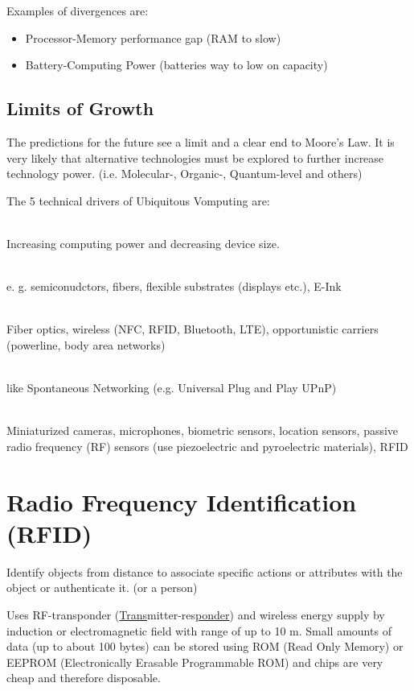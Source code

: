 \documentclass{article}
\newlength{\wideitemsep}
\let\olditem\item
\renewcommand{\item}{\setlength{\itemsep}{\wideitemsep}\olditem}
\begin{document}
\begin{multicols}{2}
Examples of divergences are:
\begin{itemize}
    \item Processor-Memory performance gap (RAM to slow)
    \item Battery-Computing Power (batteries way to low on capacity)
\end{itemize}

\subsection{Limits of Growth}
The predictions for the future see a limit and a clear end to Moore's Law. It is
very likely that alternative technologies must be explored to further increase
technology power. (i.e. Molecular-, Organic-, Quantum-level and others)

The 5 technical drivers of Ubiquitous Vomputing are:
\begin{description}
    \item[Moore's Law] \ \\
        Increasing computing power and decreasing device size.
    \item[New Materials] \ \\
        e. g. semiconudctors, fibers, flexible substrates (displays etc.),
        E-Ink
    \item[Progress in Communication Technologies] \ \\ 
        Fiber optics, wireless (NFC, RFID, Bluetooth, LTE), opportunistic
        carriers (powerline, body area networks)
    \item[New Architectural and Software Concepts] \ \\
        like Spontaneous Networking (e.g. Universal Plug and Play UPnP)
    \item[Better Sensors] \ \\
        Miniaturized cameras, microphones, biometric sensors, location sensors,
        passive radio frequency (RF) sensors (use piezoelectric and
        pyroelectric materials), RFID 
\end{description}

\section{Radio Frequency Identification (RFID)}
Identify objects from distance to associate specific actions or attributes with
the object or authenticate it. (or a person)

Uses RF-transponder (\underline{Trans}mitter-res\underline{ponder}) and wireless
energy supply by induction or electromagnetic field with range of up to 10 m.
Small amounts of data (up to about 100 bytes) can be stored using ROM (Read
Only Memory) or EEPROM (Electronically Erasable Programmable ROM) and chips are
very cheap and therefore disposable.



\end{multicols}
\end{document}
